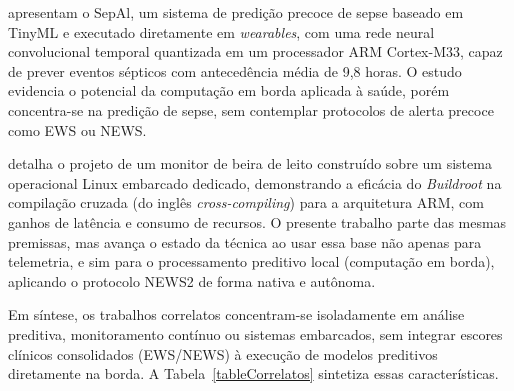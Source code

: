 
 apresentam o SepAl, um sistema de predição precoce de sepse baseado em TinyML e executado diretamente em \textit{wearables}, com uma rede neural convolucional temporal quantizada em um processador ARM Cortex-M33, capaz de prever eventos sépticos com antecedência média de 9,8 horas. O estudo evidencia o potencial da computação em borda aplicada à saúde, porém concentra-se na predição de sepse, sem contemplar protocolos de alerta precoce como EWS ou NEWS.

 detalha o projeto de um monitor de beira de leito construído sobre um sistema operacional Linux embarcado dedicado, demonstrando a eficácia do \textit{Buildroot} na compilação cruzada (do inglês \textit{cross-compiling}) para a arquitetura ARM, com ganhos de latência e consumo de recursos. O presente trabalho parte das mesmas premissas, mas avança o estado da técnica ao usar essa base não apenas para telemetria, e sim para o processamento preditivo local (computação em borda), aplicando o protocolo NEWS2 de forma nativa e autônoma.

Em síntese, os trabalhos correlatos concentram-se isoladamente em análise preditiva, monitoramento contínuo ou sistemas embarcados, sem integrar escores clínicos consolidados (EWS/NEWS) à execução de modelos preditivos diretamente na borda. A Tabela~\ref{tableCorrelatos} sintetiza essas características.

